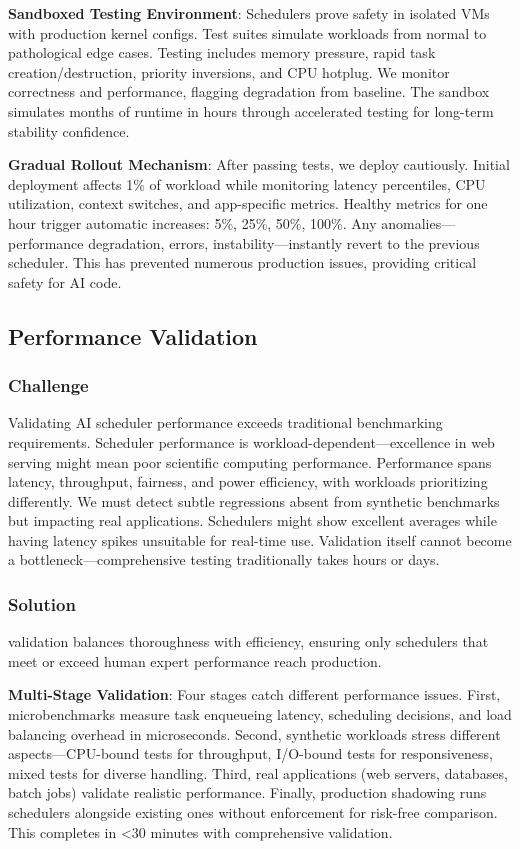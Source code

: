 \textbf{Sandboxed Testing Environment}: Schedulers prove safety in isolated VMs with production kernel configs. Test suites simulate workloads from normal to pathological edge cases. Testing includes memory pressure, rapid task creation/destruction, priority inversions, and CPU hotplug. We monitor correctness and performance, flagging degradation from baseline. The sandbox simulates months of runtime in hours through accelerated testing for long-term stability confidence.

\textbf{Gradual Rollout Mechanism}: After passing tests, we deploy cautiously. Initial deployment affects 1\% of workload while monitoring latency percentiles, CPU utilization, context switches, and app-specific metrics. Healthy metrics for one hour trigger automatic increases: 5\%, 25\%, 50\%, 100\%. Any anomalies—performance degradation, errors, instability—instantly revert to the previous scheduler. This has prevented numerous production issues, providing critical safety for AI code.

\subsection{Performance Validation}

\subsubsection{Challenge}
Validating AI scheduler performance exceeds traditional benchmarking requirements. Scheduler performance is workload-dependent—excellence in web serving might mean poor scientific computing performance. Performance spans latency, throughput, fairness, and power efficiency, with workloads prioritizing differently. We must detect subtle regressions absent from synthetic benchmarks but impacting real applications. Schedulers might show excellent averages while having latency spikes unsuitable for real-time use. Validation itself cannot become a bottleneck—comprehensive testing traditionally takes hours or days.

\subsubsection{Solution}
\sys validation balances thoroughness with efficiency, ensuring only schedulers that meet or exceed human expert performance reach production.

\textbf{Multi-Stage Validation}: Four stages catch different performance issues. First, microbenchmarks measure task enqueueing latency, scheduling decisions, and load balancing overhead in microseconds. Second, synthetic workloads stress different aspects—CPU-bound tests for throughput, I/O-bound tests for responsiveness, mixed tests for diverse handling. Third, real applications (web servers, databases, batch jobs) validate realistic performance. Finally, production shadowing runs schedulers alongside existing ones without enforcement for risk-free comparison. This completes in <30 minutes with comprehensive validation.

